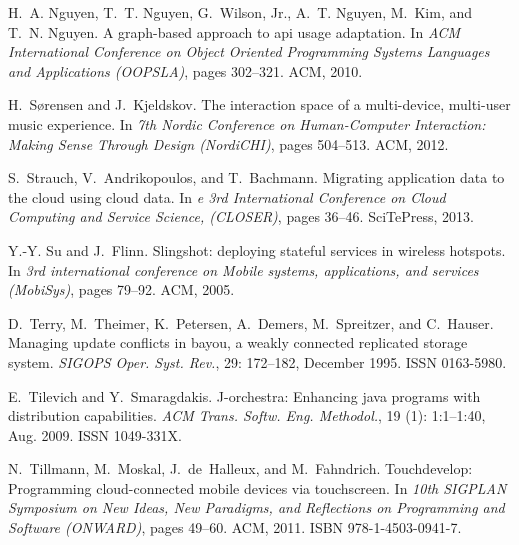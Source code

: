 \documentclass[article]{sigplanconf}
\begin{document}
\begin{thebibliography}{10}
H.~A. Nguyen, T.~T. Nguyen, G.~Wilson, Jr., A.~T. Nguyen, M.~Kim, and T.~N.
  Nguyen.
\newblock A graph-based approach to api usage adaptation.
\newblock In \emph{ACM International Conference on Object Oriented Programming
  Systems Languages and Applications (OOPSLA)}, pages 302--321. ACM, 2010.

H.~S{\o}rensen and J.~Kjeldskov.
\newblock The interaction space of a multi-device, multi-user music experience.
\newblock In \emph{7th Nordic Conference on Human-Computer Interaction: Making
  Sense Through Design (NordiCHI)}, pages 504--513. ACM, 2012.

S.~Strauch, V.~Andrikopoulos, and T.~Bachmann.
\newblock Migrating application data to the cloud using cloud data.
\newblock In \emph{e 3rd International Conference on Cloud Computing and
  Service Science, (CLOSER)}, pages 36--46. SciTePress, 2013.

Y.-Y. Su and J.~Flinn.
\newblock Slingshot: deploying stateful services in wireless hotspots.
\newblock In \emph{3rd international conference on Mobile systems,
  applications, and services (MobiSys)}, pages 79--92. ACM, 2005.

D.~Terry, M.~Theimer, K.~Petersen, A.~Demers, M.~Spreitzer, and C.~Hauser.
\newblock Managing update conflicts in bayou, a weakly connected replicated
  storage system.
\newblock \emph{SIGOPS Oper. Syst. Rev.}, 29: 172--182, December 1995.
\newblock ISSN 0163-5980.

E.~Tilevich and Y.~Smaragdakis.
\newblock J-orchestra: Enhancing java programs with distribution capabilities.
\newblock \emph{ACM Trans. Softw. Eng. Methodol.}, 19 (1):
  1:1--1:40, Aug. 2009.
\newblock ISSN 1049-331X.

N.~Tillmann, M.~Moskal, J.~de~Halleux, and M.~Fahndrich.
\newblock Touchdevelop: Programming cloud-connected mobile devices via
  touchscreen.
\newblock In \emph{10th SIGPLAN Symposium on New Ideas, New Paradigms, and
  Reflections on Programming and Software (ONWARD)}, pages 49--60. ACM, 2011.
\newblock ISBN 978-1-4503-0941-7.


\end{thebibliography}
\end{document}
